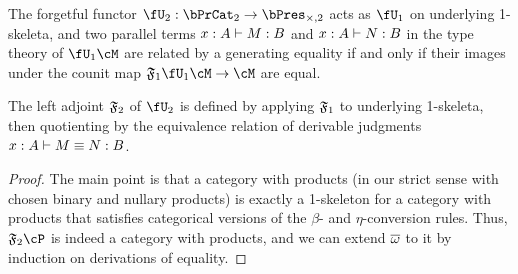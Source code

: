 \begin{defn}\label{thm:catprod-thy-underlying-2}
  The forgetful functor $\fU_2 : \prcat2 \to \timespres2$ acts as $\fU_1$ on underlying 1-skeleta, and two parallel terms $x:A\vdash M:B$ and $x:A\vdash N:B$ in the type theory of $\fU_1\cM$ are related by a generating equality if and only if their images under the counit map $\F1 \fU_1 \cM \to \cM$ are equal.
\end{defn}

\begin{thm}\label{thm:catprod-thy-initial-2}\label{thm:catprod-thy-initial}
  The left adjoint $\mathfrak{F}_{2}$ of $\fU_2$ is defined by applying $\mathfrak{F}_{1}$ to underlying 1-skeleta, then quotienting by the equivalence relation of derivable judgments $x:A\vdash M\equiv N:B$.
\end{thm}
\begin{proof}
  The main point is that a category with products (in our strict sense with chosen binary and nullary products) is exactly a 1-skeleton for a category with products that satisfies categorical versions of the $\beta$- and $\eta$-conversion rules.
  Thus, $\F2\cP$ is indeed a category with products, and we can extend $\overline{\omega}$ to it by induction on derivations of equality.
\end{proof}

